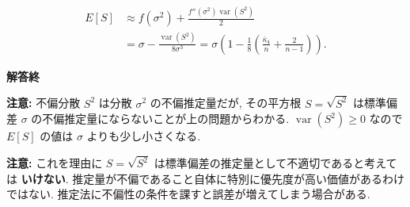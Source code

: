 \documentclass[10pt, a4paper,xelatex,ja=standard]{bxjsarticle}
\newcommand\op{\operatorname}
\newcommand\bk{\bar\kappa}
\begin{document}
\[
\begin{aligned}
E[S] &\approx
f(\sigma^2) + \frac{f''(\sigma^2)\op{var}(S^2)}{2} 
\\ &=
\sigma - \frac{\op{var}(S^2)}{8\sigma^3} =
\sigma\left(1 - \frac{1}{8}\left(\frac{\bk_4}{n} + \frac{2}{n-1}\right)\right).
\end{aligned}
\]

\textbf{解答終}

    \textbf{注意:} 不偏分散 \(S^2\) は分散 \(\sigma^2\) の不偏推定量だが,
その平方根 \(S=\sqrt{S^2}\) は標準偏差 \(\sigma\)
の不偏推定量にならないことが上の問題からわかる. \(\op{var}(S^2) \ge 0\)
なので \(E[S]\) の値は \(\sigma\) よりも少し小さくなる.

\textbf{注意:} これを理由に \(S=\sqrt{S^2}\)
は標準偏差の推定量として不適切であると考えては \textbf{いけない}.
推定量が不偏であること自体に特別に優先度が高い価値があるわけではない.
推定法に不偏性の条件を課すと誤差が増えてしまう場合がある.
\end{document}
